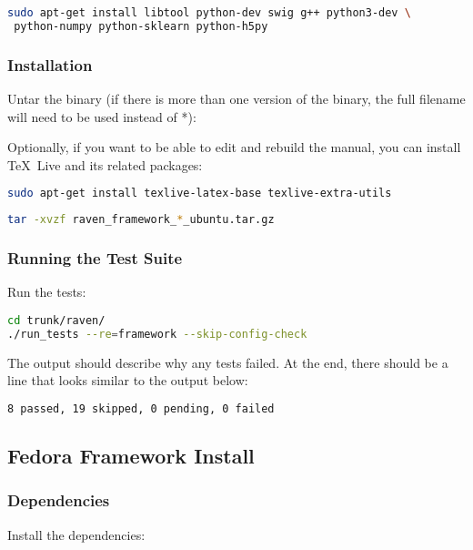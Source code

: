 \begin{lstlisting}[language=bash]
sudo apt-get install libtool python-dev swig g++ python3-dev \
 python-numpy python-sklearn python-h5py
\end{lstlisting}

\subsubsection{Installation}
Untar the binary (if there is more than one version of the
binary, the full filename will need to be used instead of *):


Optionally, if you want to be able to edit and rebuild the manual, you can 
install \TeX~Live and its related packages:
\begin{lstlisting}[language=bash]
sudo apt-get install texlive-latex-base texlive-extra-utils
\end{lstlisting}


\begin{lstlisting}[language=bash]
tar -xvzf raven_framework_*_ubuntu.tar.gz
\end{lstlisting}

\subsubsection{Running the Test Suite}
Run the tests:

\begin{lstlisting}[language=bash]
cd trunk/raven/
./run_tests --re=framework --skip-config-check
\end{lstlisting}

The output should describe why any tests failed.
%
At the end, there should be a line that looks similar to the output below:
\begin{lstlisting}[language=bash]
8 passed, 19 skipped, 0 pending, 0 failed
\end{lstlisting}

\subsection{Fedora Framework Install}

\subsubsection{Dependencies}
Install the dependencies:

